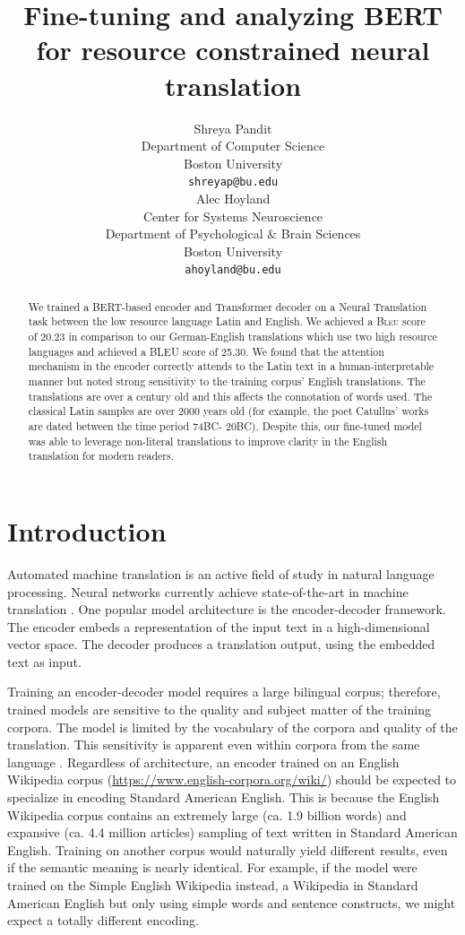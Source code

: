 \documentclass[11pt,a4paper]{article}
\title{Fine-tuning and analyzing BERT for resource constrained neural translation}
\author{Shreya Pandit \\
  Department of Computer Science \\
  Boston University \\
  \texttt{shreyap@bu.edu} \\\And
  Alec Hoyland \\
  Center for Systems Neuroscience \\
  Department of Psychological \& Brain Sciences \\
  Boston University \\
  \texttt{ahoyland@bu.edu} \\}
\date{}
\begin{document}
\maketitle
\begin{abstract}
    We trained a \textsc{BERT}-based encoder and Transformer decoder on
    a Neural Translation task between the low resource language Latin
    and English.
    We achieved a \textsc{Bleu} score of 20.23 in comparison to
    our German-English translations which use two high resource languages and achieved a BLEU score of 25.30. We found that the attention mechanism in the encoder correctly attends to the Latin text in a human-interpretable manner
    but noted strong sensitivity to the training corpus' English translations.
    The translations are over a century old
    and this affects the connotation of words used.
    The classical Latin samples are over 2000 years old (for example, the poet Catullus' works are dated between the time period 74BC- 20BC). Despite this, our fine-tuned model was able to leverage non-literal translations to improve clarity in the English translation for modern readers.
\end{abstract}

\section{Introduction}

Automated machine translation is an active field of study in natural language processing. Neural networks currently achieve state-of-the-art in machine translation \citep{ott2019fairseq, tensor2tensor}.
One popular model architecture is the encoder-decoder framework. The encoder embeds a representation of the input text in a high-dimensional vector space. 
The decoder produces a translation output, using the embedded text as input.

Training an encoder-decoder model requires a large bilingual corpus; therefore, trained models are sensitive to the quality and subject matter of the training corpora.
The model is limited by the vocabulary of the corpora and quality of the translation.
This sensitivity is apparent even within corpora from the same language \citep{dellorletta2014linguistic}.
Regardless of architecture, an encoder trained on an English Wikipedia corpus (\href{https://www.english-corpora.org/wiki/}{https://www.english-corpora.org/wiki/}) should be expected to specialize in encoding Standard American English.
This is because the English Wikipedia corpus contains an extremely large (ca. 1.9 billion words) and expansive (ca. 4.4 million articles) sampling of text written in Standard American English.
Training on another corpus would naturally yield different results,
even if the semantic meaning is nearly identical.
For example, if the model were trained on the Simple English Wikipedia instead, a Wikipedia in Standard American English but only using simple words and sentence constructs, we might expect a totally different encoding.
\end{document}

